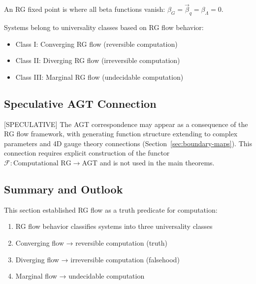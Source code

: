 \begin{definition}
\label{def:rg-fixed-points}
An RG fixed point is where all beta functions vanish: $\beta_G = \vec{\beta}_q = \beta_\Lambda = 0$.
\end{definition}

\begin{definition}
\label{def:computational-universality}
Systems belong to universality classes based on RG flow behavior:
\begin{itemize}
\item Class I: Converging RG flow (reversible computation)
\item Class II: Diverging RG flow (irreversible computation)  
\item Class III: Marginal RG flow (undecidable computation)
\end{itemize}
\end{definition}

\subsection{Speculative AGT Connection}

\begin{remark}
\label{rem:agt-consequence}
[SPECULATIVE] The AGT correspondence may appear as a consequence of the RG flow framework, with generating function structure extending to complex parameters and 4D gauge theory connections (Section~\ref{sec:boundary-maps}). This connection requires explicit construction of the functor $\mathcal{F}: \text{Computational RG} \to \text{AGT}$ and is not used in the main theorems.
\end{remark}

\subsection{Summary and Outlook}

This section established RG flow as a truth predicate for computation:

\begin{enumerate}
\item RG flow behavior classifies systems into three universality classes
\item Converging flow → reversible computation (truth)
\item Diverging flow → irreversible computation (falsehood)  
\item Marginal flow → undecidable computation
\end{enumerate}

